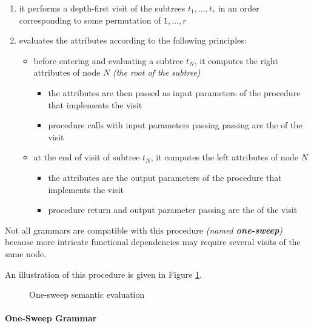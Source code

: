 \documentclass[english]{article}
\begin{document}
\begin{enumerate}[label=\arabic*, ref=(\arabic*)]
  \item it performs a depth-first visit of the subtrees \(t_1, \ldots, t_r\) in an order corresponding to some permutation of \(1, \ldots, r\)
  \item evaluates the attributes according to the following principles:
        \begin{itemize}
          \item before entering and evaluating a subtree \(t_N\), it computes the right attributes of node \(N\) \textit{(the root of the subtree)}
                \begin{itemize}[label=\(\rightarrow\)]
                  \item the attributes are then passed as input parameters of the procedure that implements the visit
                  \item procedure calls with input parameters passing passing are the  of the visit
                \end{itemize}
          \item at the end of visit of subtree \(t_N\), it computes the left attributes of node \(N\)
                \begin{itemize}[label=\(\rightarrow\)]
                  \item the attributes are the output parameters of the procedure that implements the visit
                  \item procedure return and output parameter passing are the  of the visit
                \end{itemize}
        \end{itemize}
\end{enumerate}

Not all grammars are compatible with this procedure \textit{(named \textbf{one-sweep})} because more intricate functional dependencies may require several visits of the same node.

An illustration of this procedure is given in Figure \ref{fig:one-sweep}.

\begin{figure}
  \centering
  \bigskip
  \caption{One-sweep semantic evaluation}
  \label{fig:one-sweep}
  \bigskip
\end{figure}

\paragraph{One-Sweep Grammar}
\label{par:one-sweep-grammar}
\end{document}
